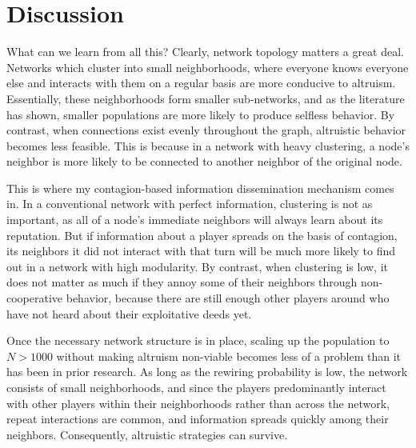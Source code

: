 \documentclass[12pt]{article}
\begin{document}
\section*{Discussion}
What can we learn from all this? Clearly, network topology matters a great deal. Networks which cluster into small neighborhoods, where everyone knows everyone else and interacts with them on a regular basis are more conducive to altruism. Essentially, these neighborhoods form smaller sub-networks, and as the literature has shown, smaller populations are more likely to produce selfless behavior. By contrast, when connections exist evenly throughout the graph, altruistic behavior becomes less feasible. This is because in a network with heavy clustering, a node's neighbor is more likely to be connected to another neighbor of the original node.

This is where my contagion-based information dissemination mechanism comes in. In a conventional network with perfect information, clustering is not as important, as all of a node's immediate neighbors will always learn about its reputation. But if information about a player spreads on the basis of contagion, its neighbors it did not interact with that turn will be much more likely to find out in a network with high modularity. By contrast, when clustering is low, it does not matter as much if they annoy some of their neighbors through non-cooperative behavior, because there are still enough other players around who have not heard about their exploitative deeds yet.

Once the necessary network structure is in place, scaling up the population to $N>1000$ without making altruism non-viable becomes less of a problem than it has been in prior research. As long as the rewiring probability is low, the network consists of small neighborhoods, and since the players predominantly interact with other players within their neighborhoods rather than across the network, repeat interactions are common, and information spreads quickly among their neighbors. Consequently, altruistic strategies can survive.

\end{document}

